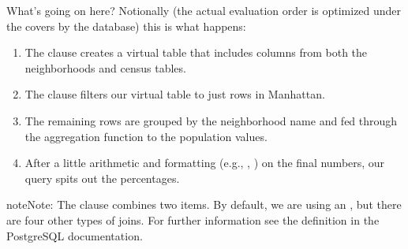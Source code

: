 \documentclass[a4paper,11pt,english]{sphinxmanual}
\begin{document}
\begin{sphinxVerbatim}[commandchars=\\\{\}]
                               
                          
                                 
                                  
\end{sphinxVerbatim}

What’s going on here? Notionally (the actual evaluation order is optimized under the covers by the database) this is what happens:
\begin{enumerate}
\def\theenumi{\arabic{enumi}}
\def\labelenumi{\theenumi .}
\makeatletter\def\p@enumii{\p@enumi \theenumi .}\makeatother
\item {} 
The  clause creates a virtual table that includes columns from both the neighborhoods and census tables.

\item {} 
The  clause filters our virtual table to just rows in Manhattan.

\item {} 
The remaining rows are grouped by the neighborhood name and fed through the aggregation function to  the population values.

\item {} 
After a little arithmetic and formatting (e.g., , ) on the final numbers, our query spits out the percentages.

\end{enumerate}

\begin{sphinxadmonition}{note}{Note:}
The  clause combines two  items.  By default, we are using an , but there are four other types of joins. For further information see the  definition in the PostgreSQL documentation.
\end{sphinxadmonition}
\end{document}
